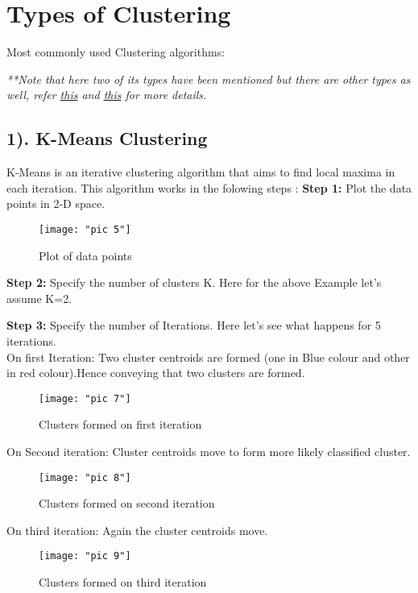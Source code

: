 \documentclass[Proceedings]{ascelike}
\begin{document}
\section{Types of Clustering}
\vspace{3mm}
Most commonly used Clustering algorithms:\\
{{\small\textit{**Note that here two of its types have been mentioned but there are other types as well, refer \href{https://home.deib.polimi.it/matteucc/Clustering/tutorial_html/index.html}{this} and \href{https://www.analyticsvidhya.com/blog/2013/11/getting-clustering-right/}{this} for more details.}}
\subsection{1). K-Means Clustering}
K-Means is an iterative clustering algorithm that aims to find local maxima in each iteration. This algorithm works in the folowing steps :
\newpage
\textbf{Step 1:} Plot the data points in 2-D space.
\begin{figure}[!htb]
	\centering
	\texttt{[image: "pic 5"]}
	\caption{Plot of data points}
	\label{Plot of data points}
\end{figure}

\textbf{Step 2:} Specify the number of clusters K. Here for the above Example let's assume K=2.

\textbf{Step 3:} Specify the number of Iterations. Here let's see what happens for 5 iterations.\\
\newpage
On first Iteration: Two cluster centroids are formed (one in Blue colour and other in  red colour).Hence conveying that two clusters are formed.
\begin{figure}[!ht]
	\centering
	\texttt{[image: "pic 7"]}
	\caption{Clusters formed on first iteration}
	\label{fig:pic-6}
\end{figure}

On Second iteration: Cluster centroids move to form more likely classified cluster.
\begin{figure}[!ht]
	\centering
	\texttt{[image: "pic 8"]}
	\caption{Clusters formed on second iteration}
	\label{fig:pic-8}
\end{figure}
\newpage
On third iteration: Again the cluster centroids move.
\begin{figure}[!ht]
	\centering
	\texttt{[image: "pic 9"]}
	\caption{Clusters formed on third iteration}
	\label{fig:pic-9}
\end{figure}

}
\end{document}

